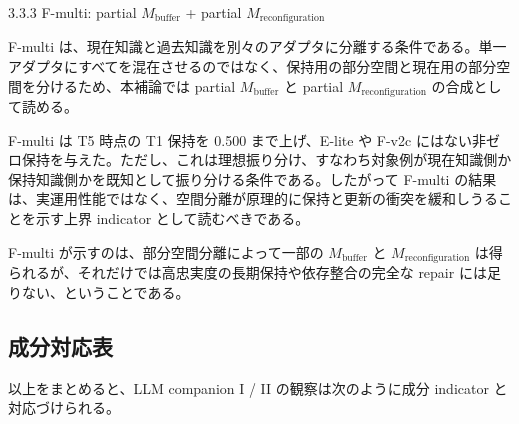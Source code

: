 \documentclass[12pt,a4paper]{article}
\begin{document}
3.3.3 F-multi: partial \(M_{\mathrm{buffer}}\) + partial \(M_{\mathrm{reconfiguration}}\)

F-multi は、現在知識と過去知識を別々のアダプタに分離する条件である。単一アダプタにすべてを混在させるのではなく、保持用の部分空間と現在用の部分空間を分けるため、本補論では partial \(M_{\mathrm{buffer}}\) と partial \(M_{\mathrm{reconfiguration}}\) の合成として読める。

F-multi は T5 時点の T1 保持を 0.500 まで上げ、E-lite や F-v2c にはない非ゼロ保持を与えた。ただし、これは理想振り分け、すなわち対象例が現在知識側か保持知識側かを既知として振り分ける条件である。したがって F-multi の結果は、実運用性能ではなく、空間分離が原理的に保持と更新の衝突を緩和しうることを示す上界 indicator として読むべきである。

F-multi が示すのは、部分空間分離によって一部の \(M_{\mathrm{buffer}}\) と \(M_{\mathrm{reconfiguration}}\) は得られるが、それだけでは高忠実度の長期保持や依存整合の完全な repair には足りない、ということである。

\subsection{成分対応表}\label{ux6210ux5206ux5bfeux5fdcux8868}

以上をまとめると、LLM companion I / II の観察は次のように成分 indicator と対応づけられる。
\end{document}
